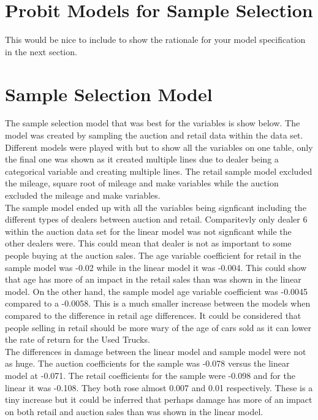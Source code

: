 \documentclass{paper}
\begin{document}
\section{Probit Models for Sample Selection}


{\color{red}
This would be nice to include to show the rationale for 
your model specification in the next section.
}

\section{Sample Selection Model}
The sample selection model that was best for the variables is show below. The model was created by sampling the auction and retail data within the data set. Different models were played with but to show all the variables on one table, only the final one was shown as it created multiple lines due to dealer being a categorical variable and creating multiple lines.  The retail sample model excluded the mileage, square root of mileage and make variables while the auction excluded the mileage and make variables.
\\
The sample model ended up with all the variables being signficant including the different types of dealers between auction and retail.  Comparitevly only dealer 6 within the auction data set for the linear model was not signficant while the other dealers were.  This could mean that dealer is not as important to some people buying at the auction sales.  The age variable coefficient for retail in the sample model was -0.02 while in the linear model it was -0.004.  This could show that age has more of an impact in the retail sales than was shown in the linear model.  On the other hand, the sample model age variable coefficient was -0.0045 compared to a -0.0058.   This is a much smaller increase between the models when compared to the difference in retail age differences.  It could be considered that people selling in retail should be more wary of the age of cars sold as it can lower the rate of return for the Used Trucks.
\\
The differences in damage between the linear model and sample model were not as huge.  The auction coefficients for the sample was -0.078 versus the linear model at -0.071.  The retail coefficients for the sample were -0.098 and for the linear it was -0.108.   They both rose almost 0.007 and 0.01 respectively.  These is a tiny increase but it could be inferred that perhaps damage has more of an impact on both retail and auction sales than was shown in the linear model.
\end{document}
